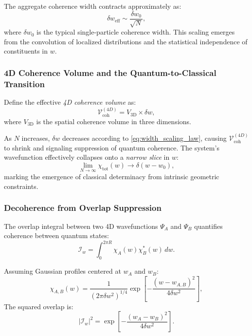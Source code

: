 \documentclass[12pt]{article}
\begin{document}
The aggregate coherence width contracts approximately as:
\begin{equation}
\delta w_{\mathrm{eff}} \sim \frac{\delta w_0}{\sqrt{N}},
\label{eq:width_scaling_law}
\end{equation}
where \(\delta w_0\) is the typical single-particle coherence width. This scaling emerges from the convolution of localized distributions and the statistical independence of constituents in \(w\).

\subsubsection*{4D Coherence Volume and the Quantum-to-Classical Transition}

Define the effective \emph{4D coherence volume} as:
\begin{equation}
\mathcal{V}_{\mathrm{coh}}^{(4D)} = V_{\mathrm{3D}} \times \delta w,
\label{eq:coherence_volume}
\end{equation}
where \(V_{\mathrm{3D}}\) is the spatial coherence volume in three dimensions.

As \(N\) increases, \(\delta w\) decreases according to \eqref{eq:width_scaling_law}, causing \(\mathcal{V}_{\mathrm{coh}}^{(4D)}\) to shrink and signaling suppression of quantum coherence. The system’s wavefunction effectively collapses onto a \emph{narrow slice} in \(w\):
\begin{equation}
\lim_{N \to \infty} \chi_{\mathrm{tot}}(w) \to \delta(w - w_0),
\label{eq:wavefunction_localization}
\end{equation}
marking the emergence of classical determinacy from intrinsic geometric constraints.

\subsubsection*{Decoherence from Overlap Suppression}

The overlap integral between two 4D wavefunctions \(\Psi_A\) and \(\Psi_B\) quantifies coherence between quantum states:
\begin{equation}
\mathcal{I}_w = \int_0^{2\pi R} \chi_A(w) \chi_B^*(w) \, dw.
\label{eq:overlap_integral}
\end{equation}

Assuming Gaussian profiles centered at \(w_A\) and \(w_B\):
\begin{equation}
\chi_{A,B}(w) = \frac{1}{(2\pi \delta w^2)^{1/4}} \exp \left[-\frac{(w - w_{A,B})^2}{4 \delta w^2} \right],
\label{eq:gaussian_profiles}
\end{equation}
The squared overlap is:
\begin{equation}
|\mathcal{I}_w|^2 = \exp \left[-\frac{(w_A - w_B)^2}{4 \delta w^2} \right].
\label{eq:overlap_gaussian_result}
\end{equation}
\end{document}
